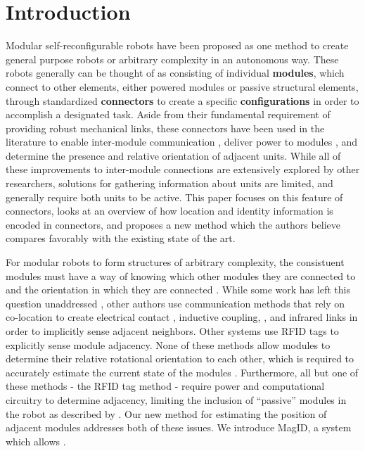 \section{Introduction}
\label{sec:Introduction}

Modular self-reconfigurable robots have been proposed as one method to create general purpose robots or arbitrary complexity in an autonomous way. These robots generally can be thought of as consisting of individual \textbf{modules}, which connect to other elements, either powered modules or passive structural elements, through standardized \textbf{connectors} to create a specific \textbf{configurations} in order to accomplish a designated task. Aside from their fundamental requirement of providing robust mechanical links, these connectors have been used in the literature to enable inter-module communication \cite{liedke2013collective} \cite{TosunDaveyLiuYim-IROS2016}, deliver power to modules \cite{todo} \cite{todo}, and determine the presence and relative orientation of adjacent units. While all of these improvements to inter-module connections are extensively explored by other researchers, solutions for gathering information about units are limited, and generally require both units to be active.  This paper focuses on this feature of connectors, looks at an overview of how location and identity information is encoded in connectors, and proposes a new method which the authors believe compares favorably with the existing state of the art.

For modular robots to form structures of arbitrary complexity, the consistuent modules must have a way of knowing which other modules they are connected to and the orientation in which they are connected \cite{todo!}. While some work has left this question unaddressed \cite{todo}, other authors use communication methods that rely on co-location to create electrical contact \cite{liedke2013collective}, inductive coupling, \cite{Gilpin-Thesis06} \cite{TosunDaveyLiuYim-IROS2016}, and infrared links in order to implicitly sense adjacent neighbors.  Other systems use RFID tags \cite{Werfel-PhDThesis06} to explicitly sense module adjacency.  None of these methods allow modules to determine their relative rotational orientation to each other, which is required to accurately estimate the current state of the modules \cite{todo?}.  Furthermore, all but one of these methods - the RFID tag method - require power and computational circuitry to determine adjacency, limiting the inclusion of ``passive'' modules in the robot as described by \cite{roombots5}.  Our new method for estimating the position of adjacent modules addresses both of these issues.  We introduce MagID, a system which allows .


